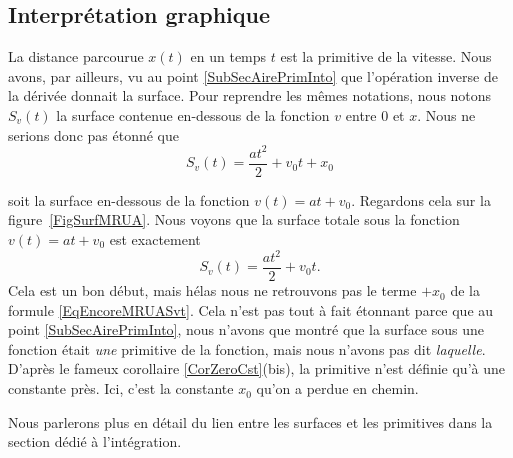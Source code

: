 \documentclass{article}
\begin{document}
					\subsection{Interprétation graphique}

La distance parcourue $x(t)$ en un temps $t$ est la primitive de la vitesse. Nous avons, par ailleurs, vu au point \ref{SubSecAirePrimInto} que l'opération inverse de la dérivée donnait la surface. Pour reprendre les mêmes notations, nous notons $S_v(t)$ la surface contenue en-dessous de la fonction $v$ entre $0$ et $x$. Nous ne serions donc pas étonné que
\begin{equation}		\label{EqEncoreMRUASvt}
	S_v(t) = \frac{ at^2 }{ 2 }+v_0t+x_0
\end{equation}
\newcommand{\CaptionSurfMRUA}{La surface bleue est un triangle de base $t$ et de hauteur $at$, tandis que le rectangle rouge est de base $t$ et de hauteur $v_0$.}

soit la surface en-dessous de la fonction $v(t)=at+v_0$. Regardons cela sur la figure~\ref{FigSurfMRUA}. Nous voyons que la surface totale sous la fonction $v(t)=at+v_0$ est exactement
\begin{equation}
	S_v(t)=\frac{ at^2 }{ 2 }+v_0t.
\end{equation}
Cela est un bon début, mais hélas nous ne retrouvons pas le terme \og $+x_0$\fg{} de la formule \eqref{EqEncoreMRUASvt}. Cela n'est pas tout à fait étonnant parce que au point \ref{SubSecAirePrimInto}, nous n'avons que montré que la surface sous une fonction était \emph{une} primitive de la fonction, mais nous n'avons pas dit \emph{laquelle}. D'après le fameux corollaire \ref{CorZeroCst}(bis), la primitive n'est définie qu'à une constante près. Ici, c'est la constante $x_0$ qu'on a perdue en chemin.

Nous parlerons plus en détail du lien entre les surfaces et les primitives dans la section dédié à l'intégration.


\label{LaFin}






\makeindex
\end{document}
